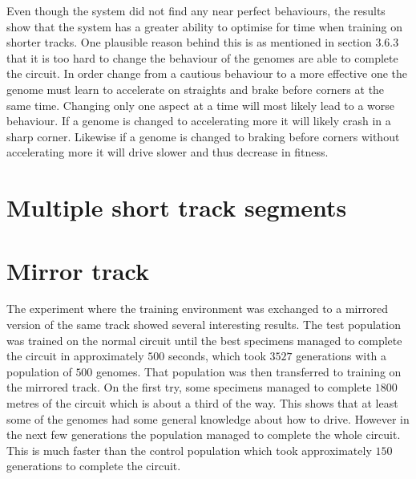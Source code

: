 
Even though the system did not find any near perfect behaviours, the results show that the system has a greater ability to optimise for time when training on shorter tracks. One plausible reason behind this is as mentioned in section $3.6.3$ that it is too hard to change the behaviour of the genomes are able to complete the circuit. In order change from a cautious behaviour to a more effective one the genome must learn to accelerate on straights and brake before corners at the same time. Changing only one aspect at a time will most likely lead to a worse behaviour. If a genome is changed to accelerating more it will likely crash in a sharp corner. Likewise if a genome is changed to braking before corners without accelerating more it will drive slower and thus decrease in fitness.  

\section{Multiple short track segments}



\section{Mirror track}

The experiment where the training environment was exchanged to a mirrored version of the same track showed several interesting results. The test population was trained on the normal circuit until the best specimens managed to complete the circuit in approximately $500$ seconds, which took $3527$ generations with a population of $500$ genomes. That population was then transferred to training on the mirrored track. On the first try, some specimens managed to complete $1800$ metres of the circuit which is about a third of the way. This shows that at least some of the genomes had some general knowledge about how to drive. However in the next few generations the population managed to complete the whole circuit. This is much faster than the control population which took approximately $150$ generations to complete the circuit. 


